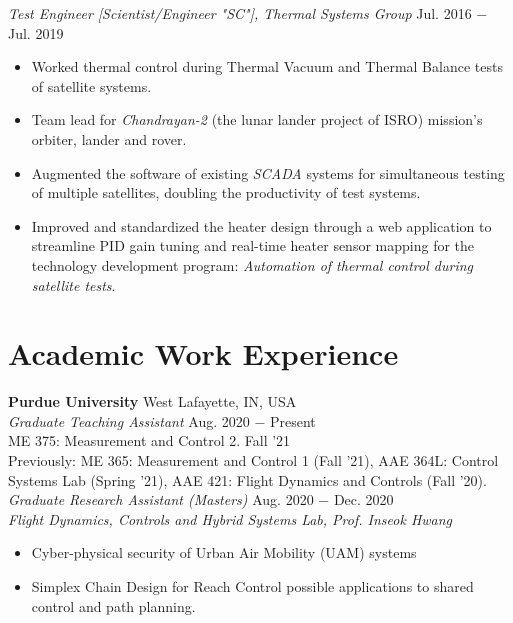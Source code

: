 \documentclass[letterpaper,10pt]{article}
\begin{document}
\vspace{3pt}
\textit{Test Engineer [Scientist/Engineer "SC"], Thermal Systems Group} \hfill Jul. 2016 $-$ Jul. 2019
\begin{itemize}[noitemsep,nolistsep,leftmargin=0.25in,label={--}]
    \item Worked thermal control during Thermal Vacuum and Thermal Balance tests of satellite systems.
	\item Team lead for \textit{Chandrayan-2} (the lunar lander project of ISRO) mission's orbiter, lander and rover.
    \item Augmented the software of existing \textit{SCADA} systems for simultaneous testing of multiple satellites, doubling the productivity of test systems.
	\item Improved and standardized the heater design through a web application to streamline PID gain tuning and real-time heater sensor mapping for the technology development program: \textit{Automation of thermal control during satellite tests}.
\end{itemize}

\section{Academic Work Experience}
\noindent \textbf{Purdue University} \hfill West Lafayette, IN, USA \\
\vspace{3pt}
\noindent \textit{Graduate Teaching Assistant} \hfill Aug. 2020 $-$ Present\\
ME 375: Measurement and Control 2.
\hfill Fall '21\\
Previously:
ME 365: Measurement and Control 1 (Fall '21),
AAE 364L: Control Systems Lab (Spring '21),
AAE 421: Flight Dynamics and Controls (Fall '20).\\
\vspace{3pt}
\noindent \textit{Graduate Research Assistant (Masters)} \hfill Aug. 2020 $-$ Dec. 2020\\
\textit{Flight Dynamics, Controls and Hybrid Systems Lab, \hfill Prof. Inseok Hwang}
\begin{itemize}[noitemsep,nolistsep,leftmargin=0.25in,label={--}]
    \item Cyber-physical security of Urban Air Mobility (UAM) systems
	\item Simplex Chain Design for Reach Control possible applications to shared control and path planning.
\end{itemize}
\end{document}
